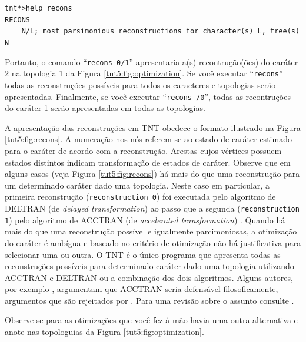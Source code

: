 \begin{refsection}
\texttt{tnt*>help recons}\\
\texttt{RECONS}\\
\texttt{~~~~N/L;    most parsimonious reconstructions for character(s) L, tree(s) N}

Portanto, o comando ``\texttt{recons 0/1}'' apresentaria a(s) recontrução(ões) do caráter 2 na topologia 1 da Figura \ref{tut5:fig:optimization}. Se você executar ``\texttt{recons}'' todas as reconstruções possíveis para todos os caracteres e topologias serão apresentadas. Finalmente, se você executar ``\texttt{recons /0}'', todas as recontruções do caráter 1 serão apresentadas em todas as topologias.

A apresentação das reconstruções em TNT obedece o formato ilustrado na Figura \ref{tut5:fig:recons}. A numeração nos nós referem-se ao estado de caráter estimado para o caráter de acordo com a reconstrução. Arestas cujos vértices possuem estados distintos indicam transformação de estados de caráter. Observe que em alguns casos (veja Figura \ref{tut5:fig:recons}) há mais do que uma reconstrução para um determinado caráter dado uma topologia. Neste caso em particular, a primeira reconstrução (\texttt{reconstruction 0}) foi executada pelo algoritmo de DELTRAN (de \textit{delayed transformation}) ao passo que a segunda  (\texttt{reconstruction 1}) pelo algoritmo de ACCTRAN (de \textit{accelerated transformation}) \parencite{Farris_1970, Swofford_and_Maddison_1987}. Quando há mais do que uma reconstrução possível e igualmente parcimoniosas, a otimização do caráter é ambígua \parencite{Farris_1970} e baseado no critério de otimização não há justificativa para selecionar uma ou outra. O TNT é o único programa que apresenta todas as reconstruções possíveis para determinado caráter dado uma topologia utilizando ACCTRAN e DELTRAN ou a combinação dos dois algoritmos. Alguns autores, por exemplo \textcite{dePinna_1991}, argumentam que ACCTRAN seria defensável filosoficamente, argumentos que são rejeitados por \textcite{Agnarsson_and_Miller_2008}. Para uma revisão sobre o assunto consulte \textcite{Agnarsson_and_Miller_2008}.

Observe se para as otimizações que você fez à mão havia uma outra alternativa e anote nas topologuias da Figura \ref{tut5:fig:optimization}.


\end{refsection}

